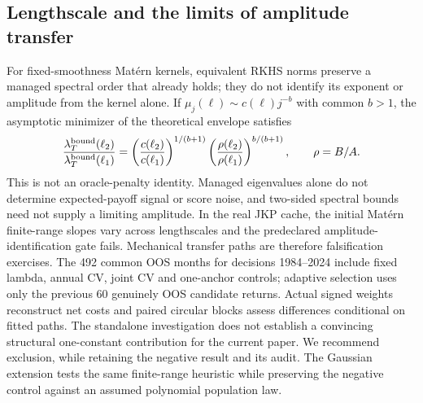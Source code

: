 \subsection{Lengthscale and the limits of amplitude transfer}
For fixed-smoothness Mat\'ern kernels, equivalent RKHS norms preserve a managed
spectral order that already holds; they do not identify its exponent or amplitude
from the kernel alone. If $\mu_j(\ell)\sim c(\ell)j^{-b}$ with common $b>1$,
the asymptotic minimizer of the theoretical envelope satisfies
\[
 \frac{\lambda_T^{\rm bound}(\ell_2)}{\lambda_T^{\rm bound}(\ell_1)}
 =\left(\frac{c(\ell_2)}{c(\ell_1)}\right)^{1/(b+1)}
  \left(\frac{\rho(\ell_2)}{\rho(\ell_1)}\right)^{b/(b+1)},\qquad\rho=B/A.
\]
This is not an oracle-penalty identity. Managed eigenvalues alone do not determine
expected-payoff signal or score noise, and two-sided spectral bounds need not supply
a limiting amplitude. In the real JKP cache, the initial Mat\'ern finite-range slopes
vary across lengthscales and the predeclared amplitude-identification gate fails.
Mechanical transfer paths are therefore falsification exercises. The 492 common
OOS months for decisions 1984--2024 include fixed lambda, annual CV, joint CV and
one-anchor controls; adaptive selection uses only the previous 60 genuinely OOS
candidate returns. Actual signed weights reconstruct net costs and paired circular
blocks assess differences conditional on fitted paths. The standalone investigation
does not establish a convincing structural one-constant contribution for the current
paper. We recommend exclusion, while retaining the negative result and its audit.
The Gaussian extension tests the same finite-range heuristic while preserving
the negative control against an assumed polynomial population law.
